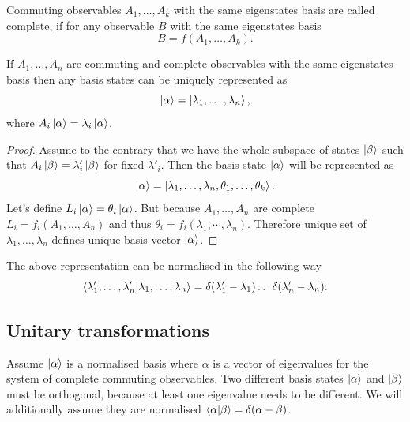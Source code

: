 \documentclass[main.tex]{subfiles}
\begin{document}
\begin{definition}
Commuting observables $A_1, \dots, A_k$ with the same eigenstates basis are called complete, if for any observable $B$ with the same eigenstates basis 
\begin{equation}
B = f(A_1,  \dots, A_k).
\end{equation}
\end{definition}

\begin{fact}
If $A_1, \dots, A_n$ are commuting and complete observables with the same eigenstates basis then any basis states can be uniquely represented as 
\begin{equation}
\ket{\alpha} = \ket{\lambda_1, \dots, \lambda_n},
\end{equation}
where $A_i \ket{\alpha} = \lambda_i \ket{\alpha}$.  
\end{fact}
\begin{proof}
Assume to the contrary that we have the whole subspace of states $\ket{\beta}$ such that $A_i \ket{\beta} = \lambda'_i \ket{\beta}$ for fixed $\lambda'_i$. Then the basis state $\ket{\alpha}$ will be represented as
\begin{equation}
 \ket{\alpha} = \ket{\lambda_1, \dots, \lambda_n, \theta_1, \dots, \theta_k}.
\end{equation}
Let's define $L_i\ket{\alpha} = \theta_i \ket{\alpha}$. But because $A_1, \dots, A_n$ are complete $L_i = f_i(A_1, \dots, A_n)$ and thus $\theta_i = f_i(\lambda_1, \cdots, \lambda_n)$. Therefore unique set of  $\lambda_1, \dots, \lambda_n$ defines unique basis vector $\ket{\alpha}$.
\end{proof}

The above representation can be normalised in the following way
\begin{equation}
\bra{\lambda'_1, \dots, \lambda'_n}\ket{\lambda_1, \dots, \lambda_n} = \delta(\lambda'_1 - \lambda_1)\dots\delta(\lambda'_n - \lambda_n).
\end{equation}

\subsection{Unitary transformations}

Assume $\ket{\alpha}$ is a normalised basis where $\alpha$ is a vector of eigenvalues for the system of complete commuting observables. Two different basis states $\ket{\alpha}$ and $\ket{\beta}$ must be orthogonal, because at least one eigenvalue needs to be different. We will additionally assume they are normalised $\bra{\alpha}\ket{\beta}= \delta(\alpha - \beta)$. 
\end{document}

